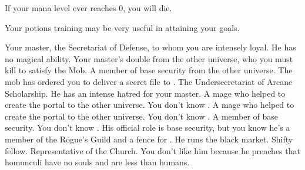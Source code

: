 \documentclass[char]{guildcamp3}
\begin{document}
\begin{itemz}[Notes]
  \item If your mana level ever reaches 0, you will die.
  \item Your potions training may be very useful in attaining your goals.
\end{itemz}


\begin{contacts}
  \contact{\cNobleOne{}} Your master, the Secretariat of Defense, to whom you are intensely loyal. He has no magical ability.
  \contact{\cPoliOne{}} Your master's double from the other universe, who you must kill to satisfy the Mob.
  \contact{\cSpecOpTwo{}} A member of base security from the other universe. The mob has ordered you to deliver a secret file to \cSpecOpTwo{\them}. 
  \contact{\cNobleTwo{}} The Undersecretariat of Arcane Scholarship. He has an intense hatred for your master.
  \contact{\cMageOne{}} A mage who helped to create the portal to the other universe. You don't know \cMageOne{\them}.
  \contact{\cMageTwo{}} A mage who helped to create the portal to the other universe. You don't know \cMageTwo{\them}.
  \contact{\cRogueOne{}} A member of base security. You don't know \cRogueOne{\them}.
  \contact{\cRogueTwo{}} His official role is base security, but you know he's a member of the Rogue's Guild and a fence for \bMagicMob{}. He runs the black market. Shifty fellow.
  \contact{\cPaladin{}} Representative of the Church. You don't like him because he preaches that homunculi have no souls and are less than humans.
\end{contacts}
\end{document}
